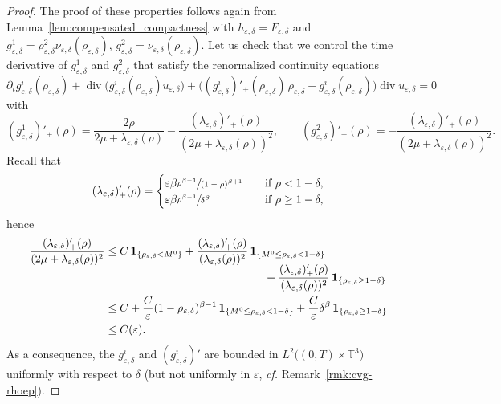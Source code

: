 \documentclass[JEP,XML,SOM,Unicode,NoEqCountersInSection]{cedram}
\newcommand{\<}{\bigl\langle}
\renewcommand{\>}{\bigr\rangle}
\theoremstyle{definition}
\theoremstyle{remark}
\newcommand{\TT}{\mathbb{T}^3}
\DeclareMathOperator{\Div}{div}
\let\ep\varepsilon
\begin{document}
\begin{proof}
The proof of these properties follows again from Lemma~\ref{lem:compensated_compactness} with $h_{\ep,\delta} = F_{\ep,\delta}$ and $g_{\ep,\delta}^1 = \rho_{\ep,\delta}^2 \nu_{\ep,\delta}(\rho_{\ep,\delta})$, $g_{\ep,\delta}^2=\nu_{\ep,\delta}(\rho_{\ep,\delta})$.
Let us check that we control the time derivative of $g_{\ep,\delta}^1$ and $g_{\ep,\delta}^2$ that satisfy the renormalized continuity equations
\begin{equation}\label{eq:renorm_gi}
\partial_t g_{\ep,\delta}^i(\rho_{\ep,\delta}) + \Div\big(g_{\ep,\delta}^i(\rho_{\ep,\delta}) u_{\ep,\delta}\big) + \Big((g_{\ep,\delta}^i)'_+(\rho_{\ep,\delta}) \, \rho_{\ep,\delta}-g_{\ep,\delta}^i(\rho_{\ep,\delta}) \Big) \Div u_{\ep,\delta} = 0
\end{equation}
with
\[ (g_{\ep,\delta}^1)'_+(\rho) =
\dfrac{2\rho}{2\mu + \lambda_{\ep,\delta}(\rho)}-\dfrac{(\lambda_{\ep,\delta})'_+(\rho)}{(2\mu + \lambda_{\ep,\delta}(\rho))^2}, \qquad (g_{\ep,\delta}^2)'_+(\rho)
= -\dfrac{(\lambda_{\ep,\delta})'_+(\rho)}{(2\mu + \lambda_{\ep,\delta}(\rho))^2}.\]
Recall that
\[
(\lambda_{\ep,\delta})'_+(\rho) = \begin{cases}
\ep \beta \sfrac{\rho^{\beta-1}}{(1-\rho)^{\beta+1}} \quad & \text{if } \rho < 1-\delta, \\
\ep \beta \sfrac{\rho^{\beta-1}}{\delta^\beta}\quad & \text{if } \rho \geq 1-\delta, \end{cases}
\]
hence
\begin{equation}\label{eq:inegal-dep-ep}
\begin{split}
\dfrac{(\lambda_{\ep,\delta})'_+(\rho)}{(2\mu + \lambda_{\ep,\delta}(\rho))^2}
& \leq C \,\mathbf{1}_{\{ \rho_{\ep,\delta} < M^0 \}}
+ \dfrac{(\lambda_{\ep,\delta})'_+(\rho)}{(\lambda_{\ep,\delta}(\rho))^2}\,\mathbf{1}_{\{ M^0 \leq \rho_{\ep,\delta} < 1-\delta \}}\\[-5pt]
&\hspace*{5cm}+ \dfrac{(\lambda_{\ep,\delta})'_+(\rho)}{(\lambda_{\ep,\delta}(\rho))^2}\,\mathbf{1}_{\{ \rho_{\ep,\delta} \geq 1-\delta \}} \\
& \leq C + \dfrac{C}{\ep}(1-\rho_{\ep,\delta})^{\beta -1}\,\mathbf{1}_{\{ M^0 \leq \rho_{\ep,\delta} < 1-\delta \}}
+ \dfrac{C}{\ep}\delta^{\beta}\,\mathbf{1}_{\{ \rho_{\ep,\delta} \geq 1-\delta \}} \\
& \leq C(\ep).
\end{split}
\end{equation}
As a consequence, the
$g^i_{\ep,\delta}$ and $(g^i_{\ep,\delta})'$ are bounded in $L^2\big((0,T)\times \TT\big)$ uniformly with respect to $\delta$ (but not uniformly in $\ep$, {\it cf.} Remark~\ref{rmk:cvg-rhoep}).

\end{proof}
\end{document}
